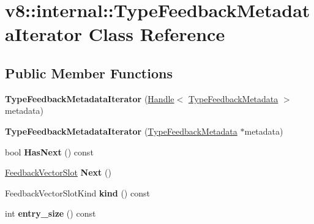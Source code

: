 \hypertarget{classv8_1_1internal_1_1_type_feedback_metadata_iterator}{}\section{v8\+:\+:internal\+:\+:Type\+Feedback\+Metadata\+Iterator Class Reference}
\label{classv8_1_1internal_1_1_type_feedback_metadata_iterator}
\subsection*{Public Member Functions}
\begin{DoxyCompactItemize}
\item 
{\bfseries Type\+Feedback\+Metadata\+Iterator} (\hyperlink{classv8_1_1internal_1_1_handle}{Handle}$<$ \hyperlink{classv8_1_1internal_1_1_type_feedback_metadata}{Type\+Feedback\+Metadata} $>$ metadata)\hypertarget{classv8_1_1internal_1_1_type_feedback_metadata_iterator_aa3ab374e2fa475328bcba10f3e957f9e}{}\label{classv8_1_1internal_1_1_type_feedback_metadata_iterator_aa3ab374e2fa475328bcba10f3e957f9e}

\item 
{\bfseries Type\+Feedback\+Metadata\+Iterator} (\hyperlink{classv8_1_1internal_1_1_type_feedback_metadata}{Type\+Feedback\+Metadata} $\ast$metadata)\hypertarget{classv8_1_1internal_1_1_type_feedback_metadata_iterator_a350739bac8512a22d2057dff2012de27}{}\label{classv8_1_1internal_1_1_type_feedback_metadata_iterator_a350739bac8512a22d2057dff2012de27}

\item 
bool {\bfseries Has\+Next} () const \hypertarget{classv8_1_1internal_1_1_type_feedback_metadata_iterator_a3d1b8ed74c54b503eb9ef40f2f5521ee}{}\label{classv8_1_1internal_1_1_type_feedback_metadata_iterator_a3d1b8ed74c54b503eb9ef40f2f5521ee}

\item 
\hyperlink{classv8_1_1internal_1_1_feedback_vector_slot}{Feedback\+Vector\+Slot} {\bfseries Next} ()\hypertarget{classv8_1_1internal_1_1_type_feedback_metadata_iterator_a4446aeaf71bd59af6165491a58d5156e}{}\label{classv8_1_1internal_1_1_type_feedback_metadata_iterator_a4446aeaf71bd59af6165491a58d5156e}

\item 
Feedback\+Vector\+Slot\+Kind {\bfseries kind} () const \hypertarget{classv8_1_1internal_1_1_type_feedback_metadata_iterator_a65ef3a2b6bd75d017d6458b18793b9bd}{}\label{classv8_1_1internal_1_1_type_feedback_metadata_iterator_a65ef3a2b6bd75d017d6458b18793b9bd}

\item 
int {\bfseries entry\+\_\+size} () const \hypertarget{classv8_1_1internal_1_1_type_feedback_metadata_iterator_a3463c1a86c4a57af8166f6415d33a8b7}{}\label{classv8_1_1internal_1_1_type_feedback_metadata_iterator_a3463c1a86c4a57af8166f6415d33a8b7}

\end{DoxyCompactItemize}
